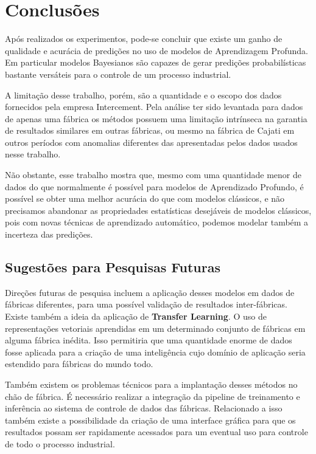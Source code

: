 \chapter{Conclusões}
\label{cap:conclusoes}


Após realizados os experimentos, pode-se concluir que existe um ganho de
qualidade e acurácia de predições no uso de modelos de Aprendizagem
Profunda. Em particular modelos Bayesianos são capazes de gerar predições
probabilísticas bastante versáteis para o controle de um processo industrial.

A limitação desse trabalho, porém, são a quantidade e o escopo dos dados
fornecidos pela empresa Intercement. Pela análise ter sido levantada para dados
de apenas uma fábrica os métodos possuem uma limitação intrínseca na garantia de
resultados similares em outras fábricas, ou mesmo na fábrica de Cajati em
outros períodos com anomalias diferentes das apresentadas pelos dados usados
nesse trabalho.

Não obstante, esse trabalho mostra que, mesmo com uma quantidade menor de dados
do que normalmente é possível para modelos de Aprendizado Profundo, é possível
se obter uma melhor acurácia do que com modelos clássicos, e não precisamos
abandonar as propriedades estatísticas desejáveis de modelos clássicos, pois com
novas técnicas de aprendizado automático, podemos modelar também a incerteza das predições.


\section{Sugestões para Pesquisas Futuras} 

Direções futuras de pesquisa incluem a aplicação desses modelos em dados
de fábricas diferentes, para uma possível validação de resultados inter-fábricas. Existe
também a ideia da aplicação de \textbf{Transfer Learning}. O uso de
representações vetoriais aprendidas em um determinado conjunto de fábricas em
alguma fábrica inédita. Isso permitiria que uma quantidade enorme de dados fosse
aplicada para a criação de uma inteligência cujo domínio de aplicação seria
estendido para fábricas do mundo todo. 

Também existem os problemas técnicos para a implantação desses métodos no chão
de fábrica. É necessário realizar a integração da pipeline de treinamento e inferência ao sistema de
controle de dados das fábricas. Relacionado a isso também existe a possibilidade
da criação de uma interface gráfica para que os resultados possam ser rapidamente acessados
para um eventual uso para controle de todo o processo industrial. 


